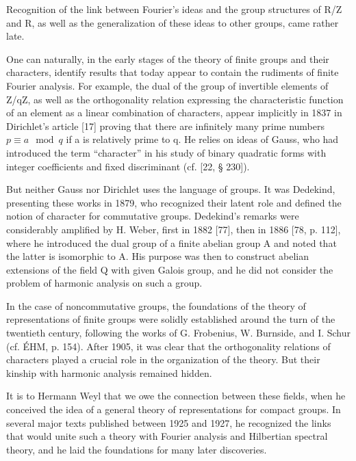 Recognition of the link between Fourier's ideas and the group structures of R/Z and R, as well as the generalization of these ideas to other groups, came rather late.

One can naturally, in the early stages of the theory of finite groups and their characters, identify results that today appear to contain the rudiments of finite Fourier analysis. For example, the dual of the group of invertible elements of Z/qZ, as well as the orthogonality relation expressing the characteristic function of an element as a linear combination of characters, appear implicitly in 1837 in Dirichlet's article {[}17{]} proving that there are infinitely many prime numbers \(p \equiv a \mod q\) if a is relatively prime to q. He relies on ideas of Gauss, who had introduced the term “character” in his study of binary quadratic forms with integer coefficients and fixed discriminant (cf. {[}22, § 230{]}).

But neither Gauss nor Dirichlet uses the language of groups. It was Dedekind, presenting these works in 1879, who recognized their latent role and defined the notion of character for commutative groups. Dedekind's remarks were considerably amplified by H. Weber, first in 1882 {[}77{]}, then in 1886 {[}78, p. 112{]}, where he introduced the dual group of a finite abelian group A and noted that the latter is isomorphic to A. His purpose was then to construct abelian extensions of the field Q with given Galois group, and he did not consider the problem of harmonic analysis on such a group.

In the case of noncommutative groups, the foundations of the theory of representations of finite groups were solidly established around the turn of the twentieth century, following the works of G. Frobenius, W. Burnside, and I. Schur (cf. ÉHM, p. 154). After 1905, it was clear that the orthogonality relations of characters played a crucial role in the organization of the theory. But their kinship with harmonic analysis remained hidden.

It is to Hermann Weyl that we owe the connection between these fields, when he conceived the idea of a general theory of representations for compact groups. In several major texts published between 1925 and 1927, he recognized the links that would unite such a theory with Fourier analysis and Hilbertian spectral theory, and he laid the foundations for many later discoveries.

